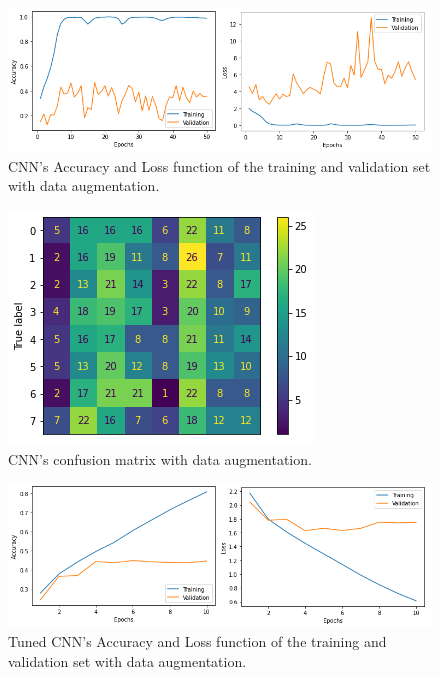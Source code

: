 \begin{figure}[ht]
\centering
\includegraphics[scale=0.6]{images/aug-2021-val-train.png}
\caption{CNN's Accuracy and Loss function of the training and validation set with data augmentation.}
\label{fig:Acc_Loss_2021_aug}
\end{figure}

\begin{figure}[ht]
\centering
\includegraphics[scale=0.6]{images/aug-2021-confusion_matrix.png}
\caption{CNN's confusion matrix with data augmentation.}
\label{fig:cf_2021_aug}
\end{figure}

\begin{figure}[ht]
\centering
\includegraphics[scale=0.6]{images/aug-tuned-val-train.png}
\caption{Tuned CNN's Accuracy and Loss function of the training and validation set with data augmentation.}
\label{fig:Acc_Loss_tuned_aug}
\end{figure}

